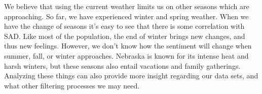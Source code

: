 We believe that using the current weather limits us on other seasons which are approaching. So far, we have experienced winter and spring weather. When we have the change of seasons it's easy to see that there is some correlation with SAD. Like most of the population, the end of winter brings new changes, and thus new feelings. However, we don't know how the sentiment will change when summer, fall, or winter approaches. Nebraska is known for its intense heat and harsh winters, but these seasons also entail vacations and family gatherings. Analyzing these things can also provide more insight regarding our data sets, and what other filtering processes we may need.
